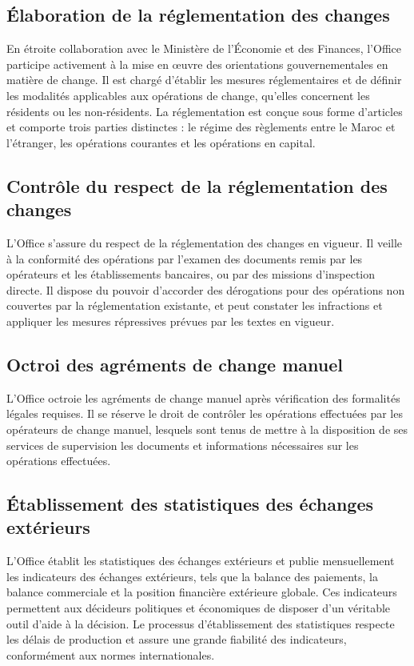 \subsection{Élaboration de la réglementation des changes}

En étroite collaboration avec le Ministère de l'Économie et des Finances, l'Office participe activement à la mise en œuvre des orientations gouvernementales en matière de change. Il est chargé d'établir les mesures réglementaires et de définir les modalités applicables aux opérations de change, qu'elles concernent les résidents ou les non-résidents. La réglementation est conçue sous forme d'articles et comporte trois parties distinctes : le régime des règlements entre le Maroc et l'étranger, les opérations courantes et les opérations en capital.

\subsection{Contrôle du respect de la réglementation des changes}

L'Office s'assure du respect de la réglementation des changes en vigueur. Il veille à la conformité des opérations par l'examen des documents remis par les opérateurs et les établissements bancaires, ou par des missions d'inspection directe. Il dispose du pouvoir d'accorder des dérogations pour des opérations non couvertes par la réglementation existante, et peut constater les infractions et appliquer les mesures répressives prévues par les textes en vigueur.

\subsection{Octroi des agréments de change manuel}

L'Office octroie les agréments de change manuel après vérification des formalités légales requises. Il se réserve le droit de contrôler les opérations effectuées par les opérateurs de change manuel, lesquels sont tenus de mettre à la disposition de ses services de supervision les documents et informations nécessaires sur les opérations effectuées.

\subsection{Établissement des statistiques des échanges extérieurs}

L'Office établit les statistiques des échanges extérieurs et publie mensuellement les indicateurs des échanges extérieurs, tels que la balance des paiements, la balance commerciale et la position financière extérieure globale. Ces indicateurs permettent aux décideurs politiques et économiques de disposer d'un véritable outil d'aide à la décision. Le processus d'établissement des statistiques respecte les délais de production et assure une grande fiabilité des indicateurs, conformément aux normes internationales.

